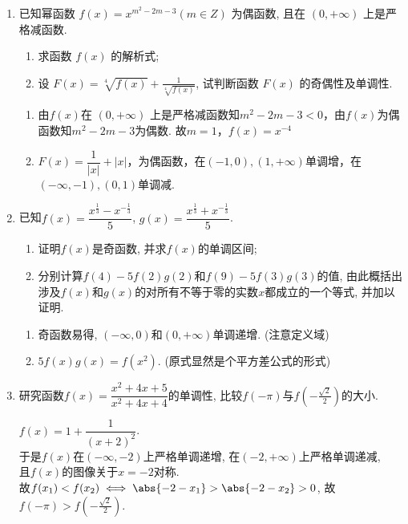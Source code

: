 \begin{enumerate}
\item 已知幂函数 $f(x)=x^{m^2-2 m-3}(m \in Z)$ 为偶函数, 且在 $(0,+\infty)$ 上是严格减函数.
\begin{enumerate}
\item 求函数 $f(x)$ 的解析式;
\item 设 $F(x)=\sqrt[4]{f(x)}+\frac{1}{\sqrt[4]{f(x)}}$, 试判断函数 $F(x)$ 的奇偶性及单调性.
\end{enumerate}
\begin{jieda}
    \begin{enumerate}
        \item 由$f(x)$在 $(0,+\infty)$ 上是严格减函数知$m^2-2 m-3 < 0$，由$f(x)$为偶函数知$m^2-2 m-3$为偶数. 故$m = 1$，$f(x) = x^{-4}$
        \item $F(x) = \dfrac{1}{|x|} + |x|$，为偶函数，在$(-1, 0), (1, +\infty)$单调增，在$(-\infty, -1), (0, 1)$单调减.
    \end{enumerate}
\end{jieda}
\begin{vspace_}
\vsp[3]
\end{vspace_}


\item 已知$f(x)=\dfrac{x^{\frac{1}{3}}-x^{-\frac{1}{3}}}{5}$, $g(x)=\dfrac{x^{\frac{1}{3}}+x^{-\frac{1}{3}}}{5}$. 
\begin{enumerate}[(1)]
\item 证明$f(x)$是奇函数, 并求$f(x)$的单调区间;
\item 分别计算$f(4)-5f(2)g(2)$和$f(9)-5f(3)g(3)$的值, 由此概括出涉及$f(x)$和$g(x)$的对所有不等于零的实数$x$都成立的一个等式, 并加以证明. 
\end{enumerate}
\begin{jieda}
\begin{enumerate}[(1)]
\item 奇函数易得, $(-\infty,0)$和$(0,+\infty)$单调递增. (注意定义域)
\item $5f(x)g(x)=f(x^2)$. (原式显然是个平方差公式的形式)
\end{enumerate}
\end{jieda}

\begin{vspace_}
\vsp[3]
\end{vspace_}


\item 研究函数$f(x)=\dfrac{x^2+4x+5}{x^2+4x+4}$的单调性, 比较$f(-\pi)$与$f(-\frac{\sqrt{2}}{2})$的大小. 
\begin{jieda}
$f(x)=1+\dfrac{1}{(x+2)^2}$. \\
于是$f(x)$在$(-\infty,-2)$上严格单调递增, 在$(-2,+\infty)$上严格单调递减, \\
且$f(x)$的图像关于$x=-2$对称. \\
故$f(x_1)<f(x_2)\iff\abs{-2-x_1}>\abs{-2-x_2}>0$, 故$f(-\pi)>f(-\frac{\sqrt{2}}{2})$. 
\end{jieda}


\end{enumerate}
